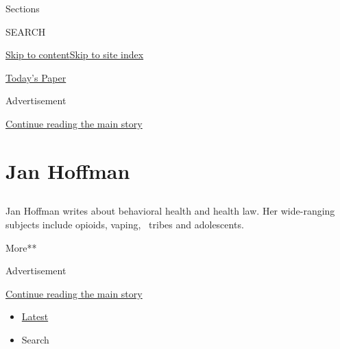 Sections

SEARCH

\protect\hyperlink{site-content}{Skip to
content}\protect\hyperlink{site-index}{Skip to site index}

\href{https://myaccount.nytimes3xbfgragh.onion/auth/login?response_type=cookie\&client_id=vi}{}

\href{https://www.nytimes3xbfgragh.onion/section/todayspaper}{Today's
Paper}

Advertisement

\protect\hyperlink{after-top}{Continue reading the main story}

\hypertarget{jan-hoffman}{%
\section{Jan Hoffman}\label{jan-hoffman}}

\subsection{}

Jan Hoffman writes about behavioral health and health law. Her
wide-ranging subjects include opioids, vaping, ~tribes and adolescents.

More**

Advertisement

\protect\hyperlink{after-mid1}{Continue reading the main story}

\begin{itemize}
\tightlist
\item
  \protect\hyperlink{stream-panel}{Latest}
\item
  Search
\end{itemize}

